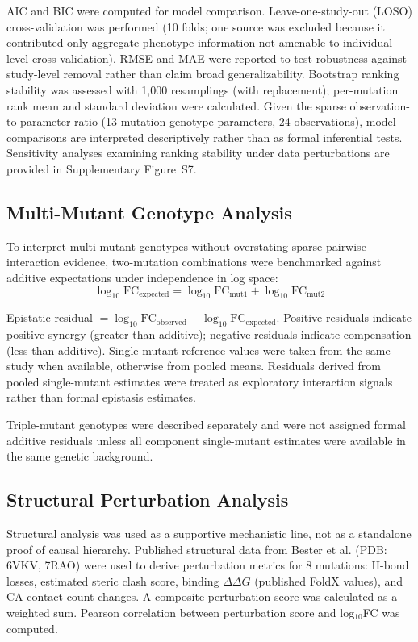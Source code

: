 \documentclass[12pt,a4paper]{article}
\begin{document}
AIC and BIC were computed for model comparison. Leave-one-study-out (LOSO) cross-validation was performed (10 folds; one source was excluded because it contributed only aggregate phenotype information not amenable to individual-level cross-validation). RMSE and MAE were reported to test robustness against study-level removal rather than claim broad generalizability. Bootstrap ranking stability was assessed with 1,000 resamplings (with replacement); per-mutation rank mean and standard deviation were calculated. Given the sparse observation-to-parameter ratio (13 mutation-genotype parameters, 24 observations), model comparisons are interpreted descriptively rather than as formal inferential tests. Sensitivity analyses examining ranking stability under data perturbations are provided in Supplementary Figure~S7.

\subsection{Multi-Mutant Genotype Analysis}

To interpret multi-mutant genotypes without overstating sparse pairwise interaction evidence, two-mutation combinations were benchmarked against additive expectations under independence in log space:
\begin{equation}
\log_{10}\text{FC}_{\text{expected}} = \log_{10}\text{FC}_{\text{mut1}} + \log_{10}\text{FC}_{\text{mut2}}
\end{equation}

Epistatic residual $= \log_{10}\text{FC}_{\text{observed}} - \log_{10}\text{FC}_{\text{expected}}$.
Positive residuals indicate positive synergy (greater than additive); negative residuals
indicate compensation (less than additive). Single mutant reference values were taken
from the same study when available, otherwise from pooled means. Residuals derived from pooled single-mutant estimates were treated as exploratory interaction signals rather than formal epistasis estimates.

Triple-mutant genotypes were described separately and were not assigned formal additive
residuals unless all component single-mutant estimates were available in the same genetic
background.

\subsection{Structural Perturbation Analysis}

Structural analysis was used as a supportive mechanistic line, not as a standalone proof of causal hierarchy. Published structural data from Bester et al. \cite{Bester2022} (PDB: 6VKV, 7RAO) were used to derive perturbation metrics for 8 mutations: H-bond losses, estimated steric clash score, binding $\Delta\Delta G$ (published FoldX values), and CA-contact count changes. A composite perturbation score was calculated as a weighted sum. Pearson correlation between perturbation score and log$_{10}$FC was computed.
\end{document}
